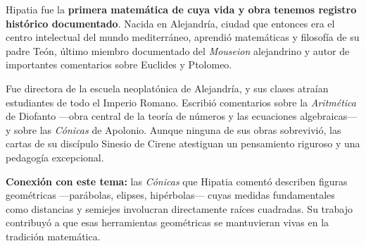 \documentclass[11pt, letterpaper]{article}
\begin{document}
\begin{tcolorbox}[enhanced, breakable,
  colback=white, colframe=blockb, colbacktitle=blockb,
  coltitle=white, arc=4pt, leftrule=5pt,
  left=10pt, right=10pt, top=12pt, bottom=10pt,
  fonttitle=\bfseries,
  attach boxed title to top left={xshift=0.5cm, yshift*=-\tcboxedtitleheight/2},
  boxed title style={colframe=blockb, colback=blockb, arc=2pt},
  title={Hipatia de Alejandría \hfill \normalfont\itshape c.\,360 — 415 d.C.}]

\begin{minipage}[t]{0.18\linewidth}
\vspace{0pt}
\end{minipage}
\hfill
\begin{minipage}[t]{0.78\linewidth}
\vspace{0pt}

Hipatia fue la \textbf{primera matemática de cuya vida y obra tenemos registro histórico documentado}. Nacida en Alejandría, ciudad que entonces era el centro intelectual del mundo mediterráneo, aprendió matemáticas y filosofía de su padre Teón, último miembro documentado del \textit{Mouseion} alejandrino y autor de importantes comentarios sobre Euclides y Ptolomeo.

\medskip
Fue directora de la escuela neoplatónica de Alejandría, y sus clases atraían estudiantes de todo el Imperio Romano. Escribió comentarios sobre la \textit{Aritmética} de Diofanto —obra central de la teoría de números y las ecuaciones algebraicas— y sobre las \textit{Cónicas} de Apolonio. Aunque ninguna de sus obras sobrevivió, las cartas de su discípulo Sinesio de Cirene atestiguan un pensamiento riguroso y una pedagogía excepcional.

\medskip
\textbf{Conexión con este tema:} las \textit{Cónicas} que Hipatia comentó describen figuras geométricas —parábolas, elipses, hipérbolas— cuyas medidas fundamentales como distancias y semiejes involucran directamente raíces cuadradas. Su trabajo contribuyó a que esas herramientas geométricas se mantuvieran vivas en la tradición matemática.
\end{minipage}

\end{tcolorbox}
\end{document}
